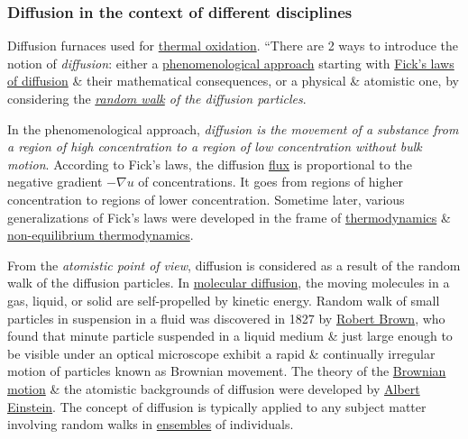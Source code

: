 \documentclass{article}
\begin{document}
\subsubsection{Diffusion in the context of different disciplines}
{\sf Diffusion furnaces used for \href{https://en.wikipedia.org/wiki/Thermal_oxidation}{thermal oxidation}}. ``There are 2 ways to introduce the notion of {\it diffusion}: either a \href{https://en.wiktionary.org/wiki/phenomenon}{phenomenological approach} starting with \href{https://en.wikipedia.org/wiki/Fick%27s_laws_of_diffusion}{Fick's laws of diffusion} \& their mathematical consequences, or a physical \& atomistic one, by considering the {\it\href{https://en.wikipedia.org/wiki/Random_walk}{random walk} of the diffusion particles}.

In the phenomenological approach, {\it diffusion is the movement of a substance from a region of high concentration to a region of low concentration without bulk motion}. According to Fick's laws, the diffusion \href{https://en.wikipedia.org/wiki/Flux#Flux_as_flow_rate_per_unit_area}{flux} is proportional to the negative gradient $-\nabla u$ of concentrations. It goes from regions of higher concentration to regions of lower concentration. Sometime later, various generalizations of Fick's laws were developed in the frame of \href{https://en.wikipedia.org/wiki/Thermodynamics}{thermodynamics} \& \href{https://en.wikipedia.org/wiki/Non-equilibrium_thermodynamics}{non-equilibrium thermodynamics}.

From the {\it atomistic point of view}, diffusion is considered as a result of the random walk of the diffusion particles. In \href{https://en.wikipedia.org/wiki/Molecular_diffusion}{molecular diffusion}, the moving molecules in a gas, liquid, or solid are self-propelled by kinetic energy. Random walk of small particles in suspension in a fluid was discovered in 1827 by \href{https://en.wikipedia.org/wiki/Robert_Brown_(botanist,_born_1773)}{\sc Robert Brown}, who found that minute particle suspended in a liquid medium \& just large enough to be visible under an optical microscope exhibit a rapid \& continually irregular motion of particles known as Brownian movement. The theory of the \href{https://en.wikipedia.org/wiki/Brownian_motion}{Brownian motion} \& the atomistic backgrounds of diffusion were developed by \href{https://en.wikipedia.org/wiki/Albert_Einstein}{\sc Albert Einstein}. The concept of diffusion is typically applied to any subject matter involving random walks in \href{https://en.wikipedia.org/wiki/Statistical_ensemble_(mathematical_physics)}{ensembles} of individuals.
\end{document}
